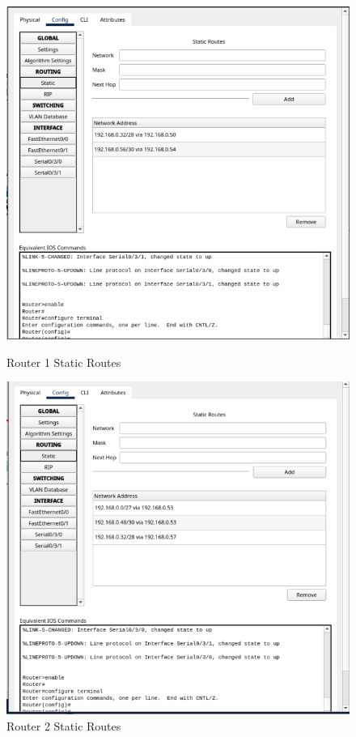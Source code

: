 \documentclass[a4paper,12pt]{article}
\begin{document}
\begin{figure}[!h]
    \centering
    \begin{minipage}{0.45\textwidth}
        \centering
        \includegraphics[width=\textwidth]{img/router1.png}
        \caption{Router 1 Static Routes}
    \end{minipage}\hfill
    \begin{minipage}{0.45\textwidth}
        \centering
        \includegraphics[width=\textwidth]{img/router2.png}
        \caption{Router 2 Static Routes}
    \end{minipage}
\end{figure}
\end{document}
